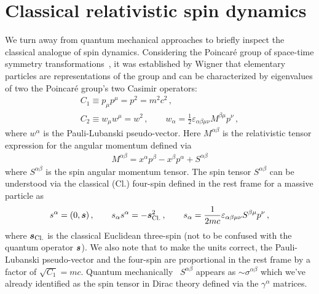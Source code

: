 \section{Classical relativistic spin dynamics}
\label{sec:cspin}
\noindent We turn away from quantum mechanical approaches to briefly inspect the classical analogue of spin dynamics. Considering the Poincar{\'e} group of space-time symmetry
transformations~\citep{Weinberg:1995mt,greiner2012quantum}, it was established by Wigner that elementary particles are representations of the group and can be characterized by eigenvalues of two the Poincar{\'e} group's two Casimir operators:
\begin{gather}
    C_{1}\equiv p_{\mu}p^{\mu} = p^{2} = m^{2}c^{2}\,,\\
    C_{2}\equiv w_{\mu}w^{\mu} = w^{2}\,,\qquad w_{\alpha}=\frac{1}{2}\varepsilon_{\alpha\beta\mu\nu}M^{\beta\mu}p^{\nu}\,,
\end{gather}
where $w^{\alpha}$ is the Pauli-Lubanski pseudo-vector. Here $M^{\alpha\beta}$ is the relativistic tensor expression for the angular momentum defined via
\begin{gather}
    M^{\alpha\beta} = x^{\alpha}p^{\beta}-x^{\beta}p^{\alpha} + S^{\alpha\beta}
\end{gather}
where $S^{\alpha\beta}$ is the spin angular momentum tensor. The spin tensor $S^{\alpha\beta}$ can be understood via the classical (Cl.) four-spin defined in the rest frame for a massive particle as
\begin{gather}
    s^{\alpha} = (0,\boldsymbol{s})\,,\qquad s_{\alpha}s^{\alpha} = -\boldsymbol{s}_\mathrm{Cl.}^{2}\,,\qquad s_{\alpha} = \frac{1}{2mc}\varepsilon_{\alpha\beta\mu\nu}S^{\beta\mu}p^{\nu}\,,
\end{gather}
where $\boldsymbol{s}_\mathrm{Cl.}$ is the classical Euclidean three-spin (not to be confused with the quantum operator $\boldsymbol{s}$). We also note that to make the units correct, the Pauli-Lubanski pseudo-vector and the four-spin are proportional in the rest frame by a factor of $\sqrt{C_{1}}=mc$. Quantum mechanically~\citep{ohlsson2011relativistic} $S^{\alpha\beta}$ appears as $\sim\sigma^{\alpha\beta}$ which we've already identified as the spin tensor in Dirac theory defined via the $\gamma^{\alpha}$ matrices.

